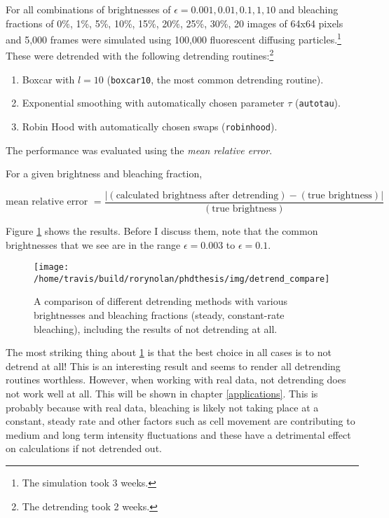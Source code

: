 \documentclass[12pt,]{book}
\providecommand{\tightlist}{%
  \setlength{\itemsep}{0pt}\setlength{\parskip}{0pt}}
\let\rmarkdownfootnote\footnote%
\def\footnote{\protect\rmarkdownfootnote}
\theoremstyle{definition}
\theoremstyle{definition}
\theoremstyle{definition}
\theoremstyle{remark}
\let\BeginKnitrBlock\begin \let\EndKnitrBlock\end
\begin{document}
For all combinations of brightnesses of
\(\epsilon = 0.001, 0.01, 0.1, 1, 10\) and bleaching fractions of 0\%,
1\%, 5\%, 10\%, 15\%, 20\%, 25\%, 30\%, 20 images of 64x64 pixels and
5,000 frames were simulated using 100,000 fluorescent diffusing
particles.\footnote{The simulation took 3 weeks.} These were detrended
with the following detrending routines:\footnote{The detrending took 2
  weeks.}

\begin{enumerate}
\def\labelenumi{\arabic{enumi}.}
\tightlist
\item
  Boxcar with \(l = 10\) (\texttt{boxcar10}, the most common detrending
  routine).
\item
  Exponential smoothing with automatically chosen parameter \(\tau\)
  (\texttt{autotau}).
\item
  Robin Hood with automatically chosen swaps (\texttt{robinhood}).
\end{enumerate}

The performance was evaluated using the \emph{mean relative error}.

\BeginKnitrBlock{definition}
\protect\hypertarget{def:unnamed-chunk-25}{}{\label{def:unnamed-chunk-25} }
For a given brightness and bleaching fraction,

\begin{equation}
\text{mean relative error } = \frac{|(\text{calculated brightness after detrending}) - (\text{true brightness})|}{(\text{true brightness})}
\label{eq:mean-relative-error}
\end{equation}
\EndKnitrBlock{definition}

Figure \ref{fig:detrend-compare} shows the results. Before I discuss
them, note that the common brightnesses that we see are in the range
\(\epsilon = 0.003\) to \(\epsilon = 0.1\).






\begin{figure}

\texttt{[image: /home/travis/build/rorynolan/phdthesis/img/detrend\_compare]} \hfill{}

\caption{A comparison of different detrending
methods with various brightnesses and bleaching fractions (steady,
constant-rate bleaching), including the results of not detrending at
all.}\label{fig:detrend-compare}
\end{figure}

The most striking thing about \ref{fig:detrend-compare} is that the best
choice in all cases is to not detrend at all! This is an interesting
result and seems to render all detrending routines worthless. However,
when working with real data, not detrending does not work well at all.
This will be shown in chapter \ref{applications}. This is probably
because with real data, bleaching is likely not taking place at a
constant, steady rate and other factors such as cell movement are
contributing to medium and long term intensity fluctuations and these
have a detrimental effect on calculations if not detrended out.
\end{document}
